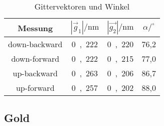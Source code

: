 \begin{table}[H]
	\begin{center}
		\begin{tabular}{c c c c}
			\toprule
			Messung & $|\vec{g}_1| / \mathrm{nm}$ & $|\vec{g_2}| / \mathrm{nm}$ & $\alpha /^\circ $ \\
			\midrule
			down-backward & \si{0,222} & \si{0,220} & 76,2 \\
			down-forward & \si{0,222} & \si{0,215} & 77,0 \\
			up-backward & \si{0,263} & \si{0,206} & 86,7 \\
			up-forward & \si{0,257} & \si{0,202} & 88,0 \\
			\bottomrule
		\end{tabular}
		\caption{Gittervektoren und Winkel}
		\label{fig:t1}
	\end{center}
\end{table}

\subsection{Gold}